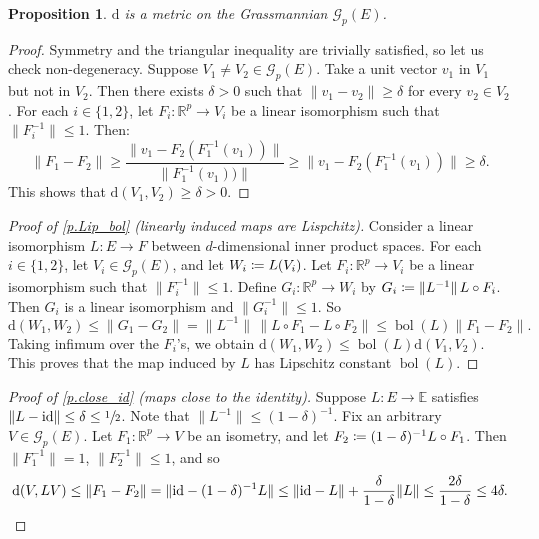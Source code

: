 \documentclass[10pt]{amsart}
\let\mathcal\mathscr
\def\vcentcolon{\mathrel{\mathop\ordinarycolon}}
\providecommand\ordinarycolon{:}
\providecommand*\coloneqq{\vcentcolon\mathrel{\mkern-1.2mu}=}
\theoremstyle{plain}
\newtheorem{proposition}[theorem]{Proposition}
\theoremstyle{definition}
\newcommand{\RR}{\mathbb{R}}
\newcommand{\EE}{\mathbb{E}}
\newcommand{\id}{\mathrm{id}}
\newcommand{\dd}{\mathrm{d}}
\DeclareMathOperator{\bol}{bol}
\newcommand{\Gr}{\mathcal{G}}
\begin{document}
\begin{proposition}\label{p.metric}
$\dd$ is a metric on the Grassmannian $\Gr_p(E)$.
\end{proposition}

\begin{proof}
Symmetry and the triangular inequality are trivially satisfied, so let us check non-degeneracy.
Suppose $V_1 \neq V_2 \in \Gr_p(E)$.
Take a unit vector $v_1$ in $V_1$ but not in $V_2$.
Then there exists $\delta>0$ such that $\|v_1-v_2\| \ge \delta$ for every $v_2 \in V_2$.
For each $i \in \{1,2\}$, let $F_i \colon \RR^p \to V_i$ be a linear isomorphism such that $\|F_i^{-1}\| \le 1$.
Then:
\[
\|F_1 - F_2\| \ge \frac{\|v_1 - F_2(F_1^{-1}(v_1))\|}{\|F_1^{-1}(v_1))\|} \ge \|v_1 - F_2(F_1^{-1}(v_1))\| \ge \delta.
\]
This shows that $\dd(V_1,V_2) \ge \delta > 0$.
\end{proof}

\begin{proof}[Proof of \cref{p.Lip_bol} (linearly induced maps are Lispchitz)]
Consider a linear isomorphism $L \colon E \to F$ between $d$-dimensional inner product spaces.
For each $i \in \{1,2\}$, let $V_i \in \Gr_p(E)$, and let $W_i \coloneqq L(V_i)$.
Let $F_i \colon \RR^p \to V_i$ be a linear isomorphism such that $\|F_i^{-1}\| \le 1$.
Define $G_i \colon \RR^p \to W_i$ by $G_i \coloneqq \|L^{-1}\| \, L \circ F_i$.
Then $G_i$ is a linear isomorphism and $\|G_i^{-1}\| \le 1$.
So
\[
\dd(W_1,W_2) \le \| G_1 - G_2 \| = \|L^{-1}\| \, \|L \circ F_1 - L \circ F_2 \| \le \bol(L) \| F_1 - F_2 \|.
\]
Taking infimum over the $F_i$'s, we obtain $\dd(W_1,W_2) \le \bol(L) \dd(V_1,V_2)$.
This proves that the map induced by $L$ has Lipschitz constant $\bol(L)$.
\end{proof}

\begin{proof}[Proof of \cref{p.close_id} (maps close to the identity)]
Suppose $L \colon E \to \EE$ satisfies $\|L - \id \|\le \delta \le \sfrac{1}{2}$.
Note that $\|L^{-1}\| \le (1-\delta)^{-1}$.
Fix an arbitrary $V \in \Gr_p(E)$. Let $F_1 \colon \RR^p \to V$ be an isometry, and let $F_2 \coloneqq (1-\delta)^{-1} L \circ F_1$.
Then $\|F_1^{-1}\|=1$, $\|F_2^{-1}\| \le 1$, and so
\begin{equation*}
\dd(V, LV) \le \|F_1 - F_2\| = \| \id - (1-\delta)^{-1} L\| \le \| \id - L\| + \frac{\delta}{1-\delta} \|L\| \le \frac{2\delta}{1-\delta} \le 4 \delta.
\qedhere
\end{equation*}
\end{proof}
\end{document}
